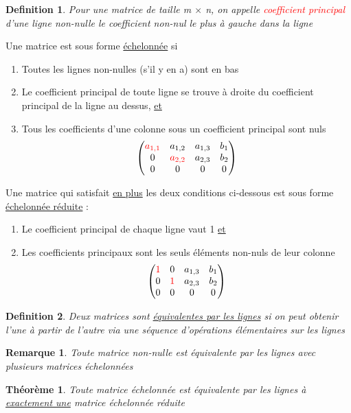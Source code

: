 \documentclass{article}
\newtheorem{definition}{Definition}[section]
\newtheorem{remark}{Remarque}[section]
\newtheorem{theorem}{Théorème}[section]
\begin{document}
\begin{definition}
    Pour une matrice de taille m \(\times\) n, on appelle \textcolor{red}{coefficient principal} d'une ligne non-nulle le coefficient non-nul le plus à gauche dans la ligne
\end{definition}
Une matrice est sous forme \underline{échelonnée} si
\begin{enumerate}
    \item Toutes les lignes non-nulles (s'il y en a) sont en bas
    \item Le coefficient principal de toute ligne se trouve à droite du coefficient principal de la ligne au dessus, \underline{et}
    \item Tous les coefficients d'une colonne sous un coefficient principal sont nuls
    \[ \begin{pmatrix}
            \textcolor{red}{a_{1,1}} & a_{1,2} & a_{1,3} & b_1 \\ 
            0 & \textcolor{red}{a_{2,2}} & a_{2,3} & b_2\\
            0 & 0 & 0 & 0
        \end{pmatrix} \]
\end{enumerate}
Une matrice qui satisfait \underline{en plus} les deux conditions ci-dessous est sous forme \underline{échelonnée réduite} :
\begin{enumerate}
    \item Le coefficient principal de chaque ligne vaut 1 \underline{et}
    \item Les coefficients principaux sont les seuls éléments non-nuls de leur colonne
    \[ \begin{pmatrix}
            \textcolor{red}{1} & 0 & a_{1,3} & b_1 \\ 
            0 & \textcolor{red}{1} & a_{2,3} & b_2\\
            0 & 0 & 0 & 0
        \end{pmatrix} \]
\end{enumerate}
\begin{definition}
    Deux matrices sont \underline{équivalentes par les lignes} si on peut obtenir l'une à partir de l'autre via une séquence d'opérations élémentaires sur les lignes
\end{definition}
\begin{remark}
    Toute matrice non-nulle est équivalente par les lignes avec plusieurs  matrices échelonnées
\end{remark}
\begin{theorem}
    Toute matrice échelonnée est équivalente par les lignes à \underline{exactement une} matrice échelonnée réduite
\end{theorem}
\end{document}
